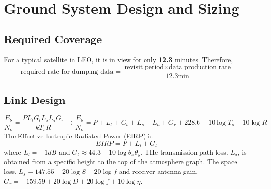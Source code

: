 \section{Ground System Design and Sizing}

\subsection{Required Coverage}
For a typical satellite in LEO, it is in view for only \textbf{12.3} minutes. Therefore,
\begin{equation}
  \text{required rate for dumping data} = \frac{\text{revisit period} \times \text{data production rate}}{12.3 \text{min}}
\end{equation}

\subsection{Link Design}
\begin{equation}
  \frac{E_b}{N_o}=\frac{PL_tG_tL_sL_aG_r}{kT_sR} \longrightarrow \frac{E_b}{N_o}=P + L_t+G_t+L_s+L_a+G_r+228.6-10\log{T_s}-10\log{R}
\end{equation}
The Effective Isotropic Radiated Power (EIRP) is
\begin{equation}
  EIRP = P + L_l+G_t
\end{equation}
where $L_l=-1dB$ and $G_t\approx44.3-10\log{\theta_x\theta_y}$.
THe transmission path loss, $L_a$, is obtained from a specific height to the top of the atmosphere graph.
The space loss, $L_s = 147.55-20\log{S} - 20\log{f}$ and receiver antenna gain, $G_r=-159.59+20\log{D}+20\log{f}+10\log{\eta}$.
